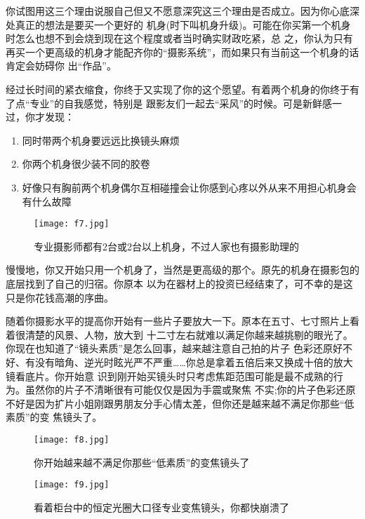 ﻿\documentclass[12pt,a4paper,onecolumn]{article}
\begin{document}
你试图用这三个理由说服自己但又不愿意深究这三个理由是否成立。因为你心底深处真正的想法是要买一个更好的
机身(时下叫机身升级)。可能在你买第一个机身时怎么也想不到会烧到现在这个程度或者当时确实财政吃紧，总
之，你认为只有再买一个更高级的机身才能配齐你的“摄影系统”，而如果只有当前这一个机身的话肯定会妨碍你
出“作品”。


经过长时间的紧衣缩食，你终于又实现了你的这个愿望。有着两个机身的你终于有了点“专业”的自我感觉，特别是
跟影友们一起去“采风”的时候。可是新鲜感一过，你才发现：

\begin{enumerate}
    \item 同时带两个机身要远远比换镜头麻烦
    \item 你两个机身很少装不同的胶卷
    \item 好像只有胸前两个机身偶尔互相碰撞会让你感到心疼以外从来不用担心机身会有什么故障
\end{enumerate}

\begin{wrapfigure}{l}{0.3\textwidth}
\vspace{-2ex}
\texttt{[image: f7.jpg]}
\caption{专业摄影师都有2台或2台以上机身，不过人家也有摄影助理的}
\vspace{-2ex}
\end{wrapfigure}


慢慢地，你又开始只用一个机身了，当然是更高级的那个。原先的机身在摄影包的底层找到了自己的归宿。你原本
以为在器材上的投资已经结束了，可不幸的是这只是你花钱高潮的序曲。

随着你摄影水平的提高你开始有一些片子要放大一下。原本在五寸、七寸照片上看着很清楚的风景、人物，放大到
十二寸左右就难以满足你越来越挑剔的眼光了。你现在也知道了“镜头素质”是怎么回事，越来越注意自己拍的片子
色彩还原好不好、有没有暗角、逆光时眩光严不严重……你总是拿着五倍后来又换成十倍的放大镜看底片。你开始意
识到刚开始买镜头时只考虑焦距范围可能是最不成熟的行为。虽然你的片子不清晰很有可能仅仅是因为手震或聚焦
不实;你的片子色彩还原不好是因为扩片小姐刚跟男朋友分手心情太差，但你还是越来越不满足你那些“低素质”的变
焦镜头了。

\begin{figure}
\centering
\vspace{-2ex}
\begin{minipage}[t]{0.4\textwidth}
    \centering
    \texttt{[image: f8.jpg]}
    \caption{你开始越来越不满足你那些“低素质”的变焦镜头了}
\end{minipage}
\hspace{2em}
\begin{minipage}[t]{0.4\textwidth}
    \centering
    \texttt{[image: f9.jpg]}
    \caption{看着柜台中的恒定光圈大口径专业变焦镜头，你都快崩溃了}
\end{minipage}
\vspace{-2ex}
\end{figure}
\end{document}

